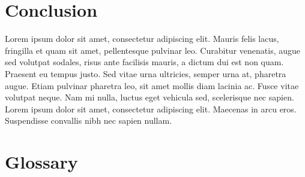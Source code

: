 \documentclass[draftclsnofoot,onecolumn]{IEEEtran}
\begin{document}
\section{Conclusion}

Lorem ipsum dolor sit amet, consectetur adipiscing elit. Mauris felis lacus, fringilla et quam sit amet, pellentesque pulvinar leo. Curabitur venenatis, augue sed volutpat sodales, risus ante facilisis mauris, a dictum dui est non quam. Praesent eu tempus justo. Sed vitae urna ultricies, semper urna at, pharetra augue. Etiam pulvinar pharetra leo, sit amet mollis diam lacinia ac. Fusce vitae volutpat neque. Nam mi nulla, luctus eget vehicula sed, scelerisque nec sapien. Lorem ipsum dolor sit amet, consectetur adipiscing elit. Maecenas in arcu eros. Suspendisse convallis nibh nec sapien nullam.










\section{Glossary}
\end{document}
